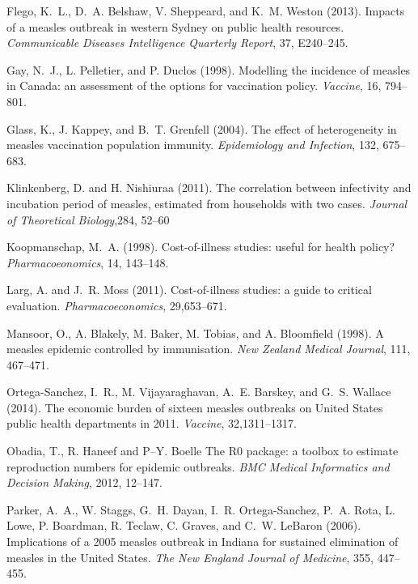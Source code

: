 \documentclass{article}
\begin{document}
{\begin{thebibliography}{}
Flego, K.~L., D.~A. Belshaw, V. Sheppeard, and K.~M. Weston (2013).
\newblock Impacts of a measles outbreak in western Sydney on public health resources.
\newblock \emph{Communicable Diseases Intelligence Quarterly Report}, 37, E240--245.

Gay, N.~J., L. Pelletier, and P. Duclos (1998).
\newblock Modelling the incidence of measles in Canada: an assessment of the options for vaccination policy.
\newblock \emph{Vaccine}, 16, 794--801.

Glass, K., J. Kappey, and B.~T. Grenfell (2004).
\newblock The effect of heterogeneity in measles vaccination population immunity.
\newblock \emph{Epidemiology and Infection}, 132, 675--683.

Klinkenberg, D. and H. Nishiuraa (2011).
\newblock The correlation between infectivity and incubation period of measles, estimated from households with two cases.
\newblock \emph{Journal of Theoretical Biology},284, 52--60

Koopmanschap, M.~A. (1998).
\newblock Cost-of-illness studies: useful for health policy?
\newblock \emph{Pharmacoeonomics}, 14, 143--148.

Larg, A. and J.~R. Moss (2011).
\newblock Cost-of-illness studies: a guide to critical evaluation.
\newblock \emph{Pharmacoeconomics}, 29,653--671.

Mansoor, O., A. Blakely, M. Baker, M. Tobias, and A. Bloomfield (1998).
\newblock A measles epidemic controlled by immunisation. 
\newblock \emph{New Zealand Medical Journal}, 111, 467--471.

Ortega-Sanchez, I.~R., M. Vijayaraghavan, A.~E. Barskey, and G.~S. Wallace (2014).
\newblock The economic burden of sixteen measles outbreaks on United States public health departments in 2011.
\newblock \emph{Vaccine}, 32,1311--1317.

Obadia, T., R. Haneef and P--Y. Boelle
\newblock The R0 package: a toolbox to estimate reproduction numbers for epidemic outbreaks.
\newblock \emph{BMC Medical Informatics and Decision Making}, 2012, 12--147.

Parker, A.~A., W. Staggs, G.~H. Dayan, I.~R. Ortega-Sanchez, P.~A. Rota, L. Lowe, P. Boardman, R. Teclaw, C. Graves, and C.~W. LeBaron (2006).
\newblock Implications of a 2005 measles outbreak in Indiana for sustained elimination of measles in the United States.
\newblock \emph{The New England Journal of Medicine}, 355, 447--455.


\end{thebibliography}}
\end{document}
